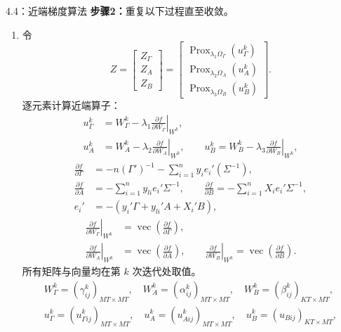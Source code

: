 \begin{bookalgorithm}{4.4：近端梯度算法}
\textbf{步骤2：}重复以下过程直至收敛。
\begin{enumerate}
\item 令
\[
Z=\begin{bmatrix}Z_\Gamma\\Z_A\\Z_B\end{bmatrix}
=\begin{bmatrix}
\operatorname{Prox}_{\lambda_1\Omega_\Gamma}(u_\Gamma^k)\\
\operatorname{Prox}_{\lambda_2\Omega_A}(u_A^k)\\
\operatorname{Prox}_{\lambda_3\Omega_B}(u_B^k)
\end{bmatrix}.
\]
逐元素计算近端算子：
\[
\begin{aligned}
u_\Gamma^k&=W_\Gamma^k-\lambda_1\left.\frac{\partial f}{\partial W_\Gamma}\right|_{W^k},\\
u_A^k&=W_A^k-\lambda_2\left.\frac{\partial f}{\partial W_A}\right|_{W^k},\qquad
u_B^k=W_B^k-\lambda_3\left.\frac{\partial f}{\partial W_B}\right|_{W^k},
\end{aligned}
\]
\[
\begin{aligned}
\frac{\partial f}{\partial\Gamma}
 &=-n(\Gamma')^{-1}-\sum_{i=1}^{n}y_ie_i'(\Sigma^{-1}),\\
\frac{\partial f}{\partial A}&=-\sum_{i=1}^{n}y_{li}e_i'\Sigma^{-1},\qquad
\frac{\partial f}{\partial B}=-\sum_{i=1}^{n}X_ie_i'\Sigma^{-1},\\
e_i'&=-(y_i'\Gamma+y_{li}'A+X_i'B),
\end{aligned}
\]
\[
\begin{aligned}
\left.\frac{\partial f}{\partial W_\Gamma}\right|_{W^k}
 &=\operatorname{vec}\left(\frac{\partial f}{\partial\Gamma}\right),\\
\left.\frac{\partial f}{\partial W_A}\right|_{W^k}
 &=\operatorname{vec}\left(\frac{\partial f}{\partial A}\right),\qquad
\left.\frac{\partial f}{\partial W_B}\right|_{W^k}
 =\operatorname{vec}\left(\frac{\partial f}{\partial B}\right).
\end{aligned}
\]
所有矩阵与向量均在第 $k$ 次迭代处取值。
\[
\begin{gathered}
W_\Gamma^k=(\gamma_{ij}^k)_{MT\times MT},\quad
W_A^k=(\alpha_{ij}^k)_{MT\times MT},\quad
W_B^k=(\beta_{ij}^k)_{KT\times MT},\\
u_\Gamma^k=(u_{\Gamma ij}^k)_{MT\times MT},\quad
u_A^k=(u_{Aij}^k)_{MT\times MT},\quad
u_B^k=(u_{Bij})_{KT\times MT},
\end{gathered}
\]
\begin{equation}

\end{equation}
\end{enumerate}
\end{bookalgorithm}
